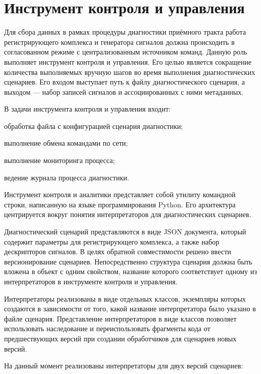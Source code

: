 \documentclass{report}
\begin{document}
\section{Инструмент контроля и управления}

Для сбора данных в рамках процедуры диагностики приёмного тракта работа регистрирующего комплекса и генератора сигналов должна происходить в согласованном режиме с централизованным источником команд. Данную роль выполняет инструмент контроля и управления. Его целью является сокращение количества выполняемых вручную шагов во время выполнения диагностических сценариев. Его входом выступает путь к файлу диагностического сценария, а выходом --- набор записей сигналов и ассоциированных с ними метаданных.

В задачи инструмента контроля и управления входит:

\begin{enummarker}
    \item обработка файла с конфигурацией сценария диагностики;
    \item выполнение обмена командами по сети;
    \item выполнение мониторинга процесса;
    \item ведение журнала процесса диагностики.
\end{enummarker}

Инструмент контроля и аналитики представляет собой утилиту командной строки, написанную на языке программирования Python. Его архитектура центрируется вокруг понятия интерпретаторов для диагностических сценариев.

Диагностический сценарий представляются в виде JSON документа, который содержит параметры для регистрирующего комплекса, а также набор дескрипторов сигналов. В целях обратной совместимости решено ввести версионирование сценариев. Непосредственно структура сценария должна быть вложена в объект с одним свойством, название которого соответствует одному из интерпретаторов в инструменте контроля и управления.

Интерпретаторы реализованы в виде отдельных классов, экземпляры которых создаются в зависимости от того, какой название интерпретатора было указано в файле сценария. Представление интерпретаторов в виде классов позволяет использовать наследование и переиспользовать фрагменты кода от предшествующих версий при создании обработчиков для сценариев новых версий.

На данный момент реализованы интерпретаторы для двух версий сценариев:
\end{document}
